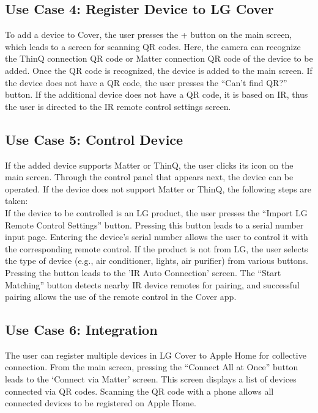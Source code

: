 \documentclass[conference]{IEEEtran}
\begin{document}
\subsection{\large{Use Case 4: Register Device to LG Cover}}
To add a device to Cover, the user presses the + button on the main screen, which leads to a screen for scanning QR codes. Here, the camera can recognize the ThinQ connection QR code or Matter connection QR code of the device to be added. Once the QR code is recognized, the device is added to the main screen. If the device does not have a QR code, the user presses the “Can’t find QR?” button. If the additional device does not have a QR code, it is based on IR, thus the user is directed to the IR remote control settings screen.\\

\subsection{\large{Use Case 5: Control Device}}
If the added device supports Matter or ThinQ, the user clicks its icon on the main screen. Through the control panel that appears next, the device can be operated. If the device does not support Matter or ThinQ, the following steps are taken:\\
If the device to be controlled is an LG product, the user presses the “Import LG Remote Control Settings” button. Pressing this button leads to a serial number input page. Entering the device's serial number allows the user to control it with the corresponding remote control. If the product is not from LG, the user selects the type of device (e.g., air conditioner, lights, air purifier) from various buttons. Pressing the button leads to the 'IR Auto Connection' screen. The “Start Matching” button detects nearby IR device remotes for pairing, and successful pairing allows the use of the remote control in the Cover app.\\

\subsection{\large{Use Case 6: Integration}}
The user can register multiple devices in LG Cover to Apple Home for collective connection. From the main screen, pressing the “Connect All at Once” button leads to the ‘Connect via Matter’ screen. This screen displays a list of devices connected via QR codes. Scanning the QR code with a phone allows all connected devices to be registered on Apple Home.\\
\end{document}
